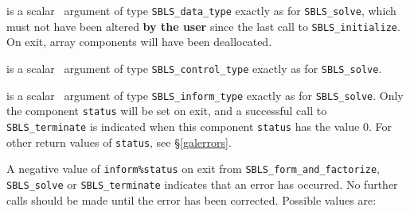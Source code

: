 \documentclass{galahad}
\newcommand{\packagename}{SBLS}
\begin{document}
\begin{description}

 is a scalar \intentinout\ argument of type
{\tt \packagename\_data\_type}
exactly as for
{\tt \packagename\_solve},
which must not have been altered {\bf by the user} since the last call to
{\tt \packagename\_initialize}.
On exit, array components will have been deallocated.

 is a scalar \intentin\ argument of type
{\tt \packagename\_control\_type}
exactly as for
{\tt \packagename\_solve}.

 is a scalar \intentout\ argument of type
{\tt \packagename\_inform\_type}
exactly as for
{\tt \packagename\_solve}.
Only the component {\tt status} will be set on exit, and a
successful call to
{\tt \packagename\_terminate}
is indicated when this  component {\tt status} has the value 0.
For other return values of {\tt status}, see \S\ref{galerrors}.

\end{description}


\galerrors
A negative value of {\tt inform\%status} on exit from
{\tt \packagename\_form\_and\_factorize},
{\tt \packagename\_solve}
or
{\tt \packagename\_terminate}
indicates that an error has occurred. No further calls should be made
until the error has been corrected. Possible values are:
\end{document}
